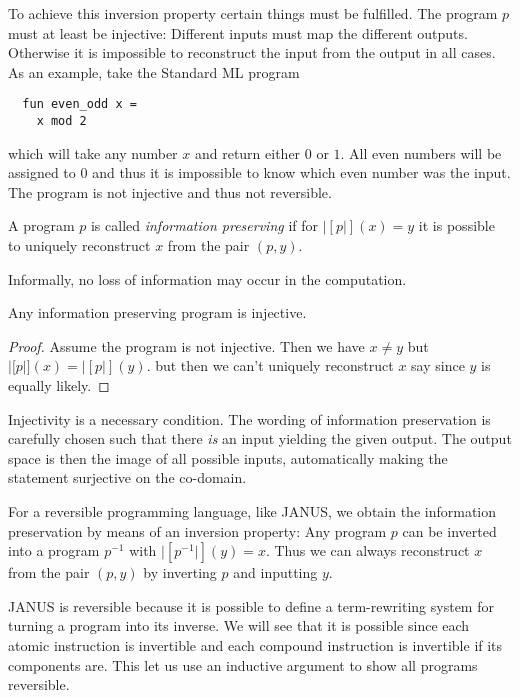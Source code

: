 To achieve this inversion property certain things must be
fulfilled. The program $p$ must at least be injective: Different
inputs must map the different outputs. Otherwise it is impossible to
reconstruct the input from the output in all cases. As an example,
take the Standard ML program
\begin{verbatim}
  fun even_odd x =
    x mod 2
\end{verbatim}
which will take any number $x$ and return either $0$ or $1$. All even
numbers will be assigned to $0$ and thus it is impossible to know
which even number was the input. The program is not injective and thus
not reversible.

\begin{defn}
  A program $p$ is called \emph{information preserving} if for
  $|[p|](x) = y$ it is possible to uniquely reconstruct $x$ from the
  pair $(p, y)$.
\end{defn}
Informally, no loss of information may occur in the computation.

\begin{thm}
  Any information preserving program is injective.
\end{thm}
\begin{proof}
  Assume the program is not injective. Then we have $x \neq y$ but
  $|[p|](x) = |[p|](y)$. but then we can't uniquely reconstruct $x$
  say since $y$ is equally likely.
\end{proof}
Injectivity is a necessary condition. The wording of information
preservation is carefully chosen such that there \emph{is} an input
yielding the given output. The output space is then the image of all
possible inputs, automatically making the statement surjective on the
co-domain.

For a reversible programming language, like JANUS, we obtain the
information preservation by means of an inversion property: Any
program $p$ can be inverted into a program $p^{-1}$ with
$|[p^{-1}|](y) = x$. Thus we can always reconstruct $x$ from the pair
$(p, y)$ by inverting $p$ and inputting $y$.

JANUS is reversible because it is possible to define a term-rewriting
system for turning a program into its inverse. We will see that it is
possible since each atomic instruction is invertible and each compound
instruction is invertible if its components are. This let us use an
inductive argument to show all programs reversible.

